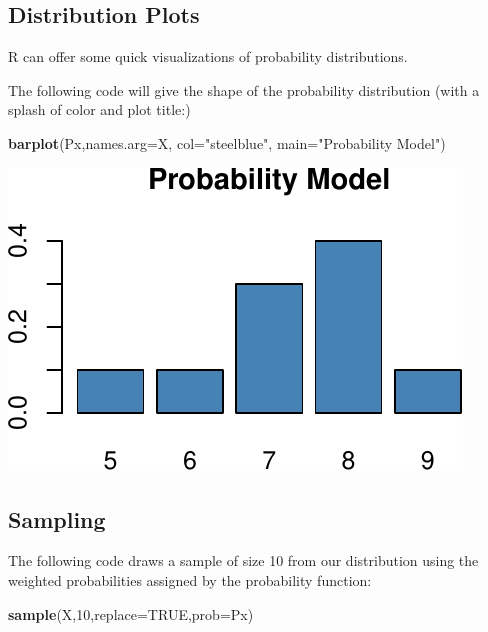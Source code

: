 \documentclass[
]{book}
\newenvironment{Shaded}{\begin{snugshade}}{\end{snugshade}}
\newcommand{\AttributeTok}[1]{\textcolor[rgb]{0.13,0.29,0.53}{#1}}
\newcommand{\ConstantTok}[1]{\textcolor[rgb]{0.56,0.35,0.01}{#1}}
\newcommand{\DecValTok}[1]{\textcolor[rgb]{0.00,0.00,0.81}{#1}}
\newcommand{\FunctionTok}[1]{\textcolor[rgb]{0.13,0.29,0.53}{\textbf{#1}}}
\newcommand{\NormalTok}[1]{#1}
\newcommand{\StringTok}[1]{\textcolor[rgb]{0.31,0.60,0.02}{#1}}
\theoremstyle{definition}
\theoremstyle{definition}
\theoremstyle{definition}
\theoremstyle{definition}
\theoremstyle{remark}
\begin{document}
\subsection*{Distribution Plots}\label{distribution-plots}

R can offer some quick visualizations of probability distributions.

The following code will give the shape of the probability distribution (with a splash of color and plot title:)

\begin{Shaded}
\begin{Highlighting}[]
\FunctionTok{barplot}\NormalTok{(Px,}\AttributeTok{names.arg=}\NormalTok{X, }\AttributeTok{col=}\StringTok{"steelblue"}\NormalTok{, }\AttributeTok{main=}\StringTok{"Probability Model"}\NormalTok{)}
\end{Highlighting}
\end{Shaded}

\includegraphics{math340-notes_files/figure-latex/unnamed-chunk-186-1.pdf}

\subsection*{Sampling}\label{sampling}

The following code draws a sample of size 10 from our distribution using the weighted probabilities assigned by the probability function:

\begin{Shaded}
\begin{Highlighting}[]
\FunctionTok{sample}\NormalTok{(X,}\DecValTok{10}\NormalTok{,}\AttributeTok{replace=}\ConstantTok{TRUE}\NormalTok{,}\AttributeTok{prob=}\NormalTok{Px)}
\end{Highlighting}
\end{Shaded}
\end{document}
